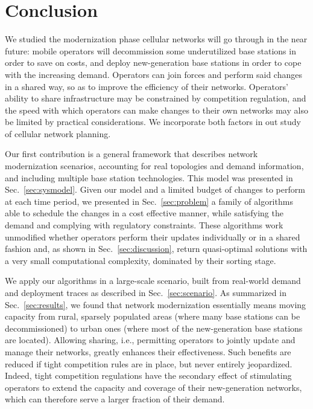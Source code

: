 \documentclass[10pt,journal,cspaper,compsoc]{IEEEtran}
\newcommand{\Sec}[1]{Sec.~\ref{sec:#1}}
\begin{document}
\section{Conclusion}
\label{sec:conclusion}

We studied the modernization phase cellular networks will go through in the near future:
mobile operators will decommission some underutilized base stations in order to save on costs,
and deploy new-generation base stations
in order to cope with the increasing demand.
Operators can join forces and perform said changes in a shared way, so as to improve the efficiency
of their networks.
Operators' ability to share infrastructure may be constrained by competition regulation, and
the speed with which operators can make changes to their own networks may also be limited by
practical considerations. We incorporate both factors in out study of cellular network planning.

Our first contribution is a
general framework that describes
network modernization scenarios, accounting for real topologies and demand information,
and including multiple base station technologies. This model was presented in \Sec{sysmodel}.
Given our model and a limited budget of changes
to perform at each time period, we presented in \Sec{problem} a family of algorithms
able to schedule the changes in a cost effective manner, while satisfying the demand
and complying with regulatory constraints. These algorithms work unmodified whether operators
perform their updates individually or in a shared fashion and, as shown in \Sec{discussion},
return quasi-optimal solutions with a very small computational complexity,
dominated by their sorting stage.

We apply our algorithms in a large-scale scenario, built from real-world demand and deployment
traces as described in \Sec{scenario}. As summarized in \Sec{results},
we found that network
modernization essentially means moving capacity from rural, sparsely populated
areas (where many base stations can be decommissioned)
to urban ones (where most of the new-generation base stations are located).
Allowing sharing, i.e.,
permitting operators to jointly update and manage their networks, greatly enhances their
effectiveness. Such benefits are reduced if tight competition rules are in place, but
never entirely jeopardized.
Indeed, tight competition regulations have the secondary effect of stimulating operators to
extend the capacity and coverage of their new-generation networks,
which can therefore serve a larger fraction of their demand.
\end{document}
